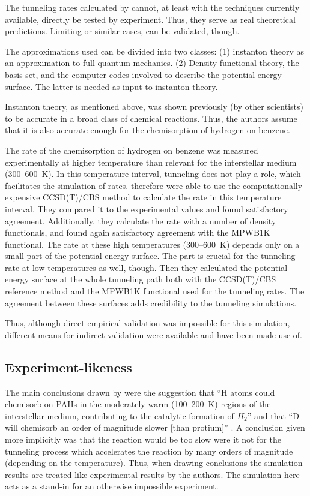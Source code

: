 \documentclass[12pt, a4paper]{article}
\numberwithin{equation}{section}
\begin{document}
The tunneling rates calculated by \citeauthor{goumans-kaestner:2010}
cannot, at least with the techniques currently available, directly be
tested by experiment. Thus, they serve as real theoretical predictions.
Limiting or similar cases, can be validated, though.

The approximations used can be divided into two classes: (1) instanton theory as an
approximation to full quantum mechanics. (2) Density functional theory, the
basis set, and the computer codes involved to describe the potential energy
surface. The latter is needed as input to instanton theory.

Instanton theory, as mentioned above, was shown previously (by other
scientists) to be accurate in a broad class of chemical reactions. Thus, the
authors assume that it is also accurate enough for the chemisorption of
hydrogen on benzene.

The rate of the chemisorption of hydrogen on benzene was measured
experimentally at higher temperature than relevant for the interstellar medium
(300--600~K). In this temperature interval, tunneling does not play a role,
which facilitates the simulation of rates. \citeauthor{goumans-kaestner:2010}
therefore were able to use the computationally expensive CCSD(T)/CBS method to
calculate the rate in this temperature interval. They compared it to the
experimental values \cite[Figure S2 of the Supporting
  Information]{goumans-kaestner:2010} and found satisfactory
agreement. Additionally, they calculate the rate with a number of density
functionals, and found again satisfactory agreement with the MPWB1K
functional. The rate at these high temperatures (300--600~K) depends only on a
small part of the potential energy surface. The part is crucial for the
tunneling rate at low temperatures as well, though. Then they calculated the
potential energy surface at the whole tunneling path both with the CCSD(T)/CBS
reference method and the MPWB1K functional used for the tunneling rates. The
agreement between these surfaces adds credibility to the tunneling
simulations.

Thus, although direct empirical validation was impossible for this
simulation, different means for indirect validation were 
available and have been made use of.

\subsection{Experiment-likeness}

The main conclusions drawn by \citeauthor{goumans-kaestner:2010} were the
suggestion that ``H atoms could chemisorb on PAHs in the moderately warm
(100--200~K) regions of the interstellar medium, contributing to the catalytic
formation of $H_2$'' and that ``D will chemisorb an order of magnitude slower
[than protium]'' \cite[p. 7352]{goumans-kaestner:2010}. A conclusion given
more implicitly was that the reaction would be too slow were it not for the
tunneling process which accelerates the reaction by many orders of magnitude
(depending on the temperature). Thus, when drawing conclusions the
simulation results are treated like experimental results by the authors.
The simulation here acts as a stand-in for an otherwise impossible
experiment.
\end{document}
